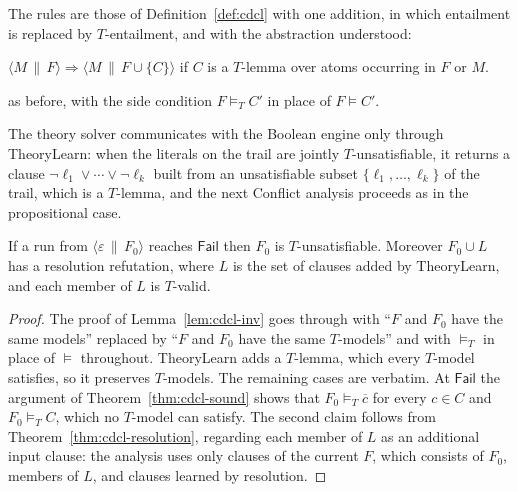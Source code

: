 \begin{definition}[DPLL($T$)]
\label{def:dpllt}
The rules are those of Definition~\ref{def:cdcl} with one addition, in which entailment is replaced by $T$-entailment, and with the abstraction understood:
\begin{description}[leftmargin=1.5em,nosep]
\item[TheoryLearn] $\langle M\,\|\,F\rangle\Rightarrow\langle M\,\|\,F\cup\{C\}\rangle$ if $C$ is a $T$-lemma over atoms occurring in $F$ or $M$.
\item[Backjump] as before, with the side condition $F\models_T C'$ in place of $F\models C'$.
\end{description}
\end{definition}

The theory solver communicates with the Boolean engine only through \textsf{TheoryLearn}: when the literals on the trail are jointly $T$-unsatisfiable, it returns a clause $\neg\ell_1\vee\cdots\vee\neg\ell_k$ built from an unsatisfiable subset $\{\ell_1,\dots,\ell_k\}$ of the trail, which is a $T$-lemma, and the next \textsf{Conflict} analysis proceeds as in the propositional case.

\begin{theorem}
\label{thm:dpllt-sound}
If a run from $\langle\varepsilon\,\|\,F_0\rangle$ reaches $\mathsf{Fail}$ then $F_0$ is $T$-unsatisfiable. Moreover $F_0\cup L$ has a resolution refutation, where $L$ is the set of clauses added by \textsf{TheoryLearn}, and each member of $L$ is $T$-valid.
\end{theorem}

\begin{proof}
The proof of Lemma~\ref{lem:cdcl-inv} goes through with ``$F$ and $F_0$ have the same models'' replaced by ``$F$ and $F_0$ have the same $T$-models'' and with $\models_T$ in place of $\models$ throughout. \textsf{TheoryLearn} adds a $T$-lemma, which every $T$-model satisfies, so it preserves $T$-models. The remaining cases are verbatim. At $\mathsf{Fail}$ the argument of Theorem~\ref{thm:cdcl-sound} shows that $F_0\models_T\overline{c}$ for every $c\in C$ and $F_0\models_T C$, which no $T$-model can satisfy. The second claim follows from Theorem~\ref{thm:cdcl-resolution}, regarding each member of $L$ as an additional input clause: the analysis uses only clauses of the current $F$, which consists of $F_0$, members of $L$, and clauses learned by resolution.
\end{proof}

